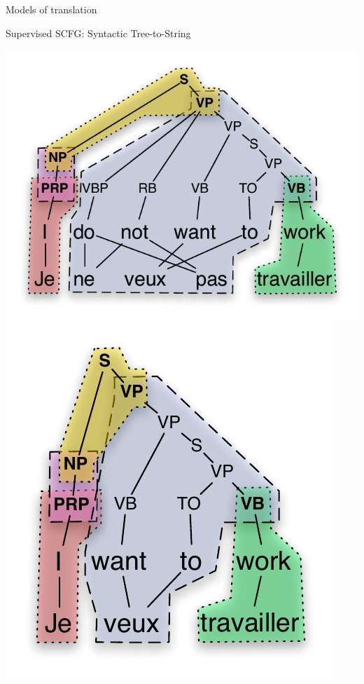 \documentclass{beamer}
\begin{document}
\begin{frame}[t]{Models of translation}
\begin{exampleblock}{Supervised SCFG: Syntactic Tree-to-String}
\begin{center}
  \includegraphics[scale=0.55]{JeNeVeuxPasTravailler-tsg.pdf}
  \hspace{0.3in}
  \includegraphics[scale=0.55]{JeVeuxTravailler-tsg.pdf}
\end{center}

\end{exampleblock}
\end{frame}
\end{document}

